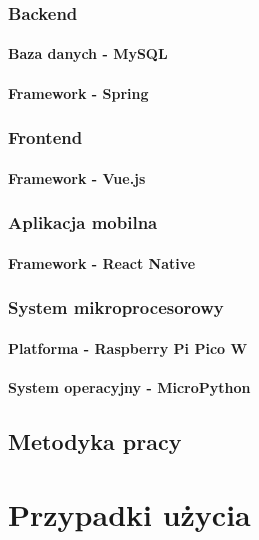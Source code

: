 \subsubsection{Backend}

\paragraph{Baza danych - MySQL}

\paragraph{Framework - Spring}


\subsubsection{Frontend}

\paragraph{Framework - Vue.js}



\subsubsection{Aplikacja mobilna}

\paragraph{Framework - React Native}



\subsubsection{System mikroprocesorowy}

\paragraph{Platforma - Raspberry Pi Pico W}

\paragraph{System operacyjny - MicroPython}



\subsection{Metodyka pracy}

\section{Przypadki użycia}


